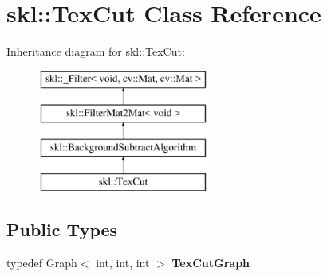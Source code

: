 \hypertarget{classskl_1_1_tex_cut}{}\section{skl\+:\+:Tex\+Cut Class Reference}
\label{classskl_1_1_tex_cut}
Inheritance diagram for skl\+:\+:Tex\+Cut\+:\begin{figure}[H]
\begin{center}
\leavevmode
\includegraphics[height=4.000000cm]{classskl_1_1_tex_cut}
\end{center}
\end{figure}
\subsection*{Public Types}
\begin{DoxyCompactItemize}
\item 
\hypertarget{classskl_1_1_tex_cut_ab6e8259e8a77259adbc83a34a00f8a61}{}\label{classskl_1_1_tex_cut_ab6e8259e8a77259adbc83a34a00f8a61} 
typedef Graph$<$ int, int, int $>$ {\bfseries Tex\+Cut\+Graph}
\end{DoxyCompactItemize}
